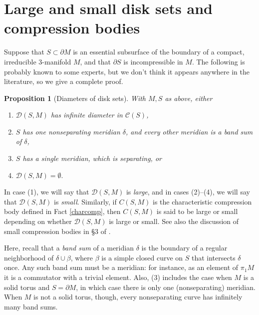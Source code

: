 \documentclass[12pt]{amsart}
\newtheorem{prop}[theorem]{Proposition}
\theoremstyle{definition}
\theoremstyle{remark}
\begin{document}
\section{Large and small disk sets and compression bodies}
\label{largesmallsec}

Suppose that $S\subset \partial M$ is an essential subsurface of the boundary of a compact, irreducible $3$-manifold $M $, and that $\partial S$ is incompressible in $M$. The following is probably known to some experts, but we don't think it appears anywhere in the literature, so we give a complete proof.


\begin{prop}[Diameters of disk sets]\label {discsetcurve} With $M,S$ as above, either
	\begin {enumerate}
	\item $\mathcal D(S,M) $  has infinite diameter in $ \mathcal C(S)$,
	\item $S$ has one nonseparating meridian $\delta$, and every other meridian is a band sum of $\delta$,
	\item $S$ has a single meridian, which is separating, or
	\item $\mathcal D(S,M) =\emptyset.$ 
	\end {enumerate}
\end{prop}

In case (1), we will say that $\mathcal D(S,M) $ is \emph{large}, and in cases (2)--(4), we will say that $\mathcal D(S,M)$ is \emph{small}. Similarly, if $C(S,M)$ is the characteristic compression body defined in Fact \ref{charcomp}, then $C(S,M)$ is said to be large or small depending on whether $\mathcal D(S,M)$ is large or small. See also the discussion of small compression bodies in \S 3 of \cite{Biringerautomorphisms}.

\medskip


Here,  recall that a \emph{band sum} of a meridian $\delta$ is  the  boundary of a regular neighborhood of $\delta \cup \beta$, where  $\beta$ is a simple closed curve on $S $ that intersects  $\delta $ once. Any such band sum must be a meridian:  for instance,  as an element of $\pi_1 M$ it is a commutator with a trivial element.  Also, (3)  includes the case when $M$ is a solid torus and $S=\partial M$, in which case  there is  only one (nonseparating) meridian.  When $M$  is not a solid torus, though, every nonseparating curve has  infinitely many band sums.
\end{document}
